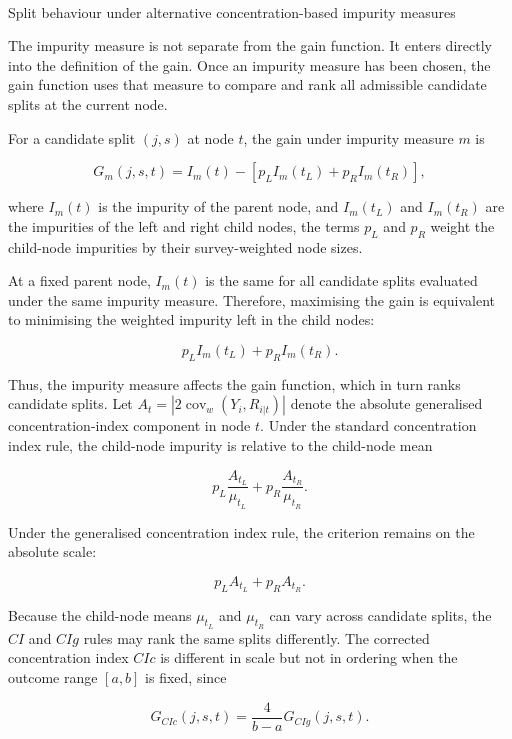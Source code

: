 \documentclass[
  11pt,
  a4paper,
]{article}
\makeatletter
\let\oldparagraph\paragraph
\renewcommand{\paragraph}{
    \@ifstar
      \xxxParagraphStar
      \xxxParagraphNoStar
  }
\newcommand{\xxxParagraphStar}[1]{\oldparagraph*{#1}\mbox{}}
\newcommand{\xxxParagraphNoStar}[1]{\oldparagraph{#1}\mbox{}}
\makeatother
\begin{document}
\paragraph{Split behaviour under alternative concentration-based
impurity measures}\label{sec-split-behaviour-impurity}

The impurity measure is not separate from the gain function. It enters
directly into the definition of the gain. Once an impurity measure has
been chosen, the gain function uses that measure to compare and rank all
admissible candidate splits at the current node.

For a candidate split \((j,s)\) at node \(t\), the gain under impurity
measure \(m\) is

\[
G_m(j,s,t)
=
I_m(t)
-
\left[
p_L I_m(t_L) + p_R I_m(t_R)
\right],
\]

where \(I_m(t)\) is the impurity of the parent node, and \(I_m(t_L)\)
and \(I_m(t_R)\) are the impurities of the left and right child nodes,
the terms \(p_L\) and \(p_R\) weight the child-node impurities by their
survey-weighted node sizes.

At a fixed parent node, \(I_m(t)\) is the same for all candidate splits
evaluated under the same impurity measure. Therefore, maximising the
gain is equivalent to minimising the weighted impurity left in the child
nodes:

\[
p_L I_m(t_L) + p_R I_m(t_R).
\]

Thus, the impurity measure affects the gain function, which in turn
ranks candidate splits. Let
\(A_t = |2\operatorname{cov}_w(Y_i, R_{i|t})|\) denote the absolute
generalised concentration-index component in node \(t\). Under the
standard concentration index rule, the child-node impurity is relative
to the child-node mean

\[
p_L \frac{A_{t_L}}{\mu_{t_L}}
+
p_R \frac{A_{t_R}}{\mu_{t_R}}.
\]

Under the generalised concentration index rule, the criterion remains on
the absolute scale:

\[
p_L A_{t_L} + p_R A_{t_R}.
\]

Because the child-node means \(\mu_{t_L}\) and \(\mu_{t_R}\) can vary
across candidate splits, the \(CI\) and \(CIg\) rules may rank the same
splits differently. The corrected concentration index \(CIc\) is
different in scale but not in ordering when the outcome range \([a,b]\)
is fixed, since

\[
G_{CIc}(j,s,t)
=
\frac{4}{b-a}G_{CIg}(j,s,t).
\]
\end{document}
